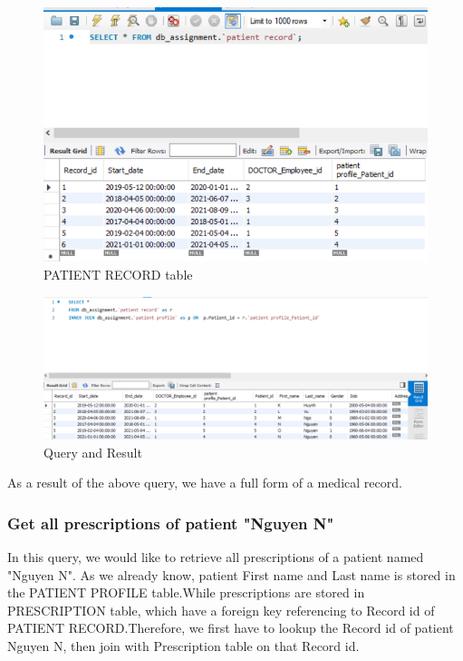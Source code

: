 \begin{figure}[H]
  \centering
  \includegraphics[width = 12cm]{assets/query_1b.png}
  \captionsetup{justification=centering,margin=2cm}
  \caption{PATIENT RECORD table}
\end{figure}

\begin{figure}[H]
  \centering
  \includegraphics[width = 12cm]{assets/query_1a.png}
  \captionsetup{justification=centering,margin=2cm}
  \caption{Query and Result}
\end{figure}

As a result of the above query, we have a full form of a medical record.

\subsubsection{Get all prescriptions of patient "Nguyen N" }
In this query, we would like to retrieve all prescriptions of a patient named "Nguyen N". As we already know, patient First name and Last name is stored in the PATIENT PROFILE table.While prescriptions are stored in PRESCRIPTION table, which have a foreign key referencing to Record id of PATIENT RECORD.Therefore, we first have to lookup the Record id of patient Nguyen N, then join with Prescription table on that Record id.

